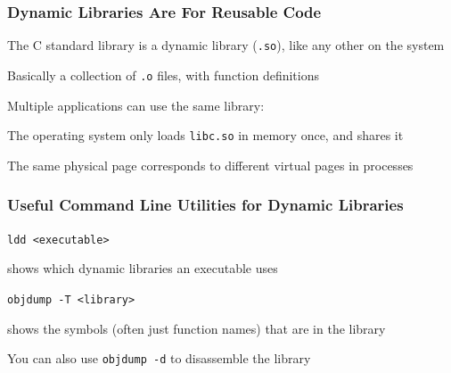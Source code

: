 \documentclass[aspectratio=169]{beamer}
\begin{document}
  \begin{frame}
    \frametitle{Dynamic Libraries Are For Reusable Code}

    The C standard library is a dynamic library (\texttt{.so}), like any other
    on the system

    \hspace{1em} Basically a collection of \texttt{.o} files, with function
    definitions

    \vspace{1em}

    Multiple applications can use the same library:

    \vspace{1em}


    \vspace{1em}

    The operating system only loads \texttt{libc.so} in memory once, and shares
    it

    \hspace{1em} The same physical page corresponds to different virtual pages
    in processes
  \end{frame}

  \begin{frame}
    \frametitle{Useful Command Line Utilities for Dynamic Libraries}

    \texttt{ldd <executable>}

    \hspace{1em} shows which dynamic libraries an executable uses

    \vspace{4em}

    \texttt{objdump -T <library>}

    \hspace{1em} shows the symbols (often just function names) that are in the
    library

    \vspace{1em}

    You can also use \texttt{objdump -d} to disassemble the library
  \end{frame}
\end{document}
